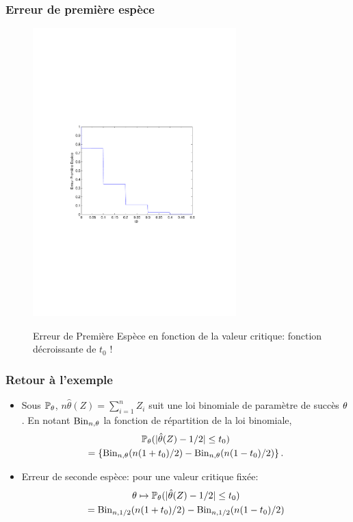 \begin{frame}
\frametitle{Erreur de première espèce}
\begin{figure}
  \centering
  \includegraphics[width=0.7\textwidth]{ErreurPremiereEspece}\\
  \caption{Erreur de Première Espèce en fonction de la valeur critique: fonction décroissante de $t_0$ !}
\end{figure}

\end{frame}


\begin{frame}
\frametitle{Retour à l'exemple}
\begin{itemize}
\item Sous $\operatorname{{\mathbb P}}_\theta$, $n \hat{\theta}(Z)= \sum_{i=1}^n Z_i$ suit une loi binomiale de paramètre de succès $\theta$.
En notant $\mathrm{Bin}_{n,\theta}$ la fonction
de répartition de la loi binomiale,
\begin{multline*}
\operatorname{{\mathbb P}}_\theta( |\hat{\theta}(Z) - 1/2| \leq t_0 ) \\
= \{\mathrm{Bin}_{n,\theta}(n(1+t_0)/2) - \mathrm{Bin}_{n,\theta}(n(1-t_0)/2) \}  \,.
\end{multline*}
\item \alert{Erreur de seconde espèce}: pour une valeur critique fixée:
\begin{multline*}
\theta \mapsto \operatorname{{\mathbb P}}_{\theta}(|\hat{\theta}(Z) - 1/2| \leq t_0) \\=
\mathrm{Bin}_{n,1/2}(n(1+t_0)/2) - \mathrm{Bin}_{n,1/2}(n(1-t_0)/2) 
\end{multline*}
\end{itemize}
\end{frame}


